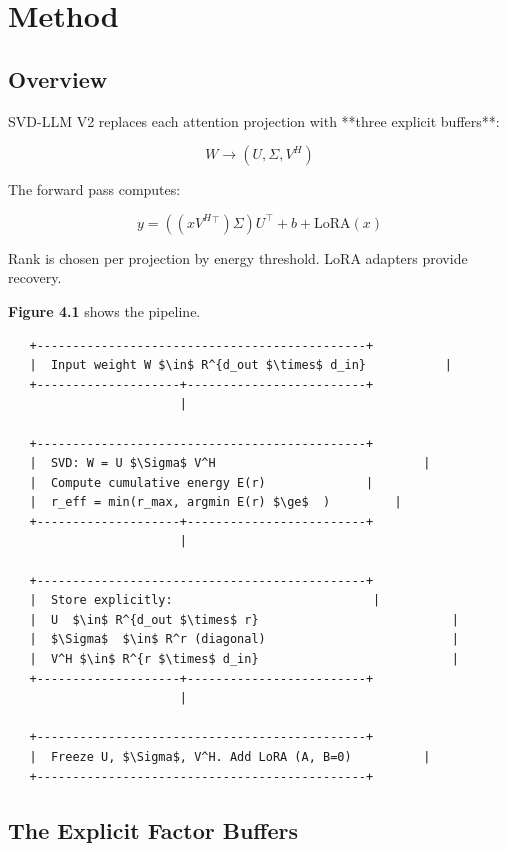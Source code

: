 
\section{Method}

\subsection{Overview}

SVD-LLM V2 replaces each attention projection with **three explicit 
buffers**:

\[
W \to (U, \Sigma, V^H)
\tag{4.1}
\]

The forward pass computes:

\[
y = ((x V^H{}^\top) \Sigma) U^\top + b + \text{LoRA}(x)
\tag{4.2}
\]

Rank is chosen per projection by energy threshold. LoRA adapters provide 
recovery.

\textbf{Figure 4.1} shows the pipeline.

\begin{lstlisting}
   +----------------------------------------------+
   |  Input weight W $\in$ R^{d_out $\times$ d_in}           |
   +--------------------+-------------------------+
                        |
                         
   +----------------------------------------------+
   |  SVD: W = U $\Sigma$ V^H                             |
   |  Compute cumulative energy E(r)              |
   |  r_eff = min(r_max, argmin E(r) $\ge$  )         |
   +--------------------+-------------------------+
                        |
                         
   +----------------------------------------------+
   |  Store explicitly:                            |
   |  U  $\in$ R^{d_out $\times$ r}                           |
   |  $\Sigma$  $\in$ R^r (diagonal)                          |
   |  V^H $\in$ R^{r $\times$ d_in}                           |
   +--------------------+-------------------------+
                        |
                         
   +----------------------------------------------+
   |  Freeze U, $\Sigma$, V^H. Add LoRA (A, B=0)          |
   +----------------------------------------------+
\end{lstlisting}

\subsection{The Explicit Factor Buffers}

